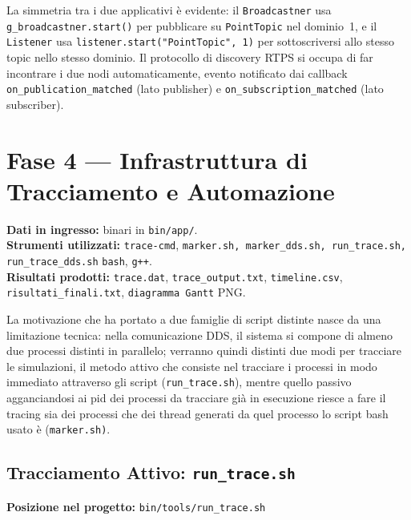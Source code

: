 La simmetria tra i due applicativi è evidente: il \texttt{Broadcastner} usa
\texttt{g\_broadcastner.start()} per pubblicare su \texttt{PointTopic} nel dominio~1,
e il \texttt{Listener} usa \texttt{listener.start("PointTopic", 1)} per
sottoscriversi allo stesso topic nello stesso dominio. Il protocollo di discovery
RTPS si occupa di far incontrare i due nodi automaticamente, evento notificato
dai callback \texttt{on\_publication\_matched} (lato publisher) e
\texttt{on\_subscription\_matched} (lato subscriber).


 
\section{Fase 4 --- Infrastruttura di Tracciamento e Automazione}
\label{sec:fase4_tracing}
\label{bin/tools}

\noindent\textbf{Dati in ingresso:} binari in \texttt{bin/app/}.\\
\textbf{Strumenti utilizzati:} \texttt{trace-cmd}, \texttt{marker.sh, marker\_dds.sh, run\_trace.sh, run\_trace\_dds.sh} \texttt{bash}, \texttt{g++}.\\
\textbf{Risultati prodotti:} \texttt{trace.dat}, \texttt{trace\_output.txt}, \texttt{timeline.csv}, \texttt{risultati\_finali.txt}, \texttt{diagramma Gantt} PNG.

La motivazione che ha portato a due famiglie di script distinte nasce da una limitazione tecnica: nella comunicazione DDS, il sistema si compone di almeno due processi distinti in parallelo; verranno quindi distinti due modi per tracciare le simulazioni, il metodo attivo che consiste nel tracciare i processi in modo immediato attraverso gli script (\texttt{run\_trace.sh}), mentre quello passivo agganciandosi ai pid dei processi da tracciare già in esecuzione riesce a fare il tracing sia dei processi che dei thread generati da quel processo lo script bash usato è (\texttt{marker.sh)}.
\clearpage
\subsection{Tracciamento Attivo: \texttt{run\_trace.sh}}

\noindent\textbf{Posizione nel progetto:} \texttt{bin/tools/run\_trace.sh}

\bigskip

